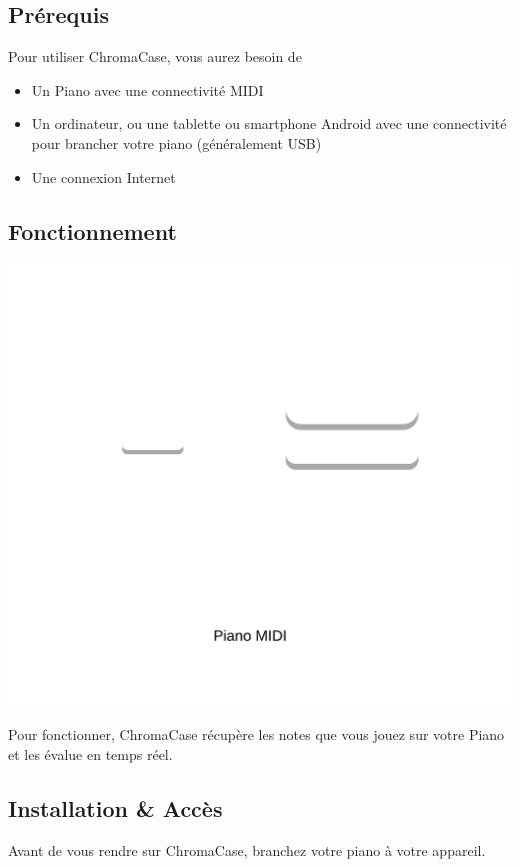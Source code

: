 \subsection{Prérequis}

Pour utiliser ChromaCase, vous aurez besoin de

\begin{itemize}
	\item Un Piano avec une connectivité MIDI
	\item Un ordinateur, ou une tablette ou smartphone Android  avec une connectivité pour brancher votre piano (généralement USB)
	\item Une connexion Internet
\end{itemize}


\subsection{Fonctionnement}
\includegraphics[width=\textwidth]{../assets/structure-front.png}

Pour fonctionner, ChromaCase récupère les notes que vous jouez sur votre Piano et les évalue en temps réel. 

\subsection{Installation \& Accès}

Avant de vous rendre sur ChromaCase, branchez votre piano à votre appareil.

